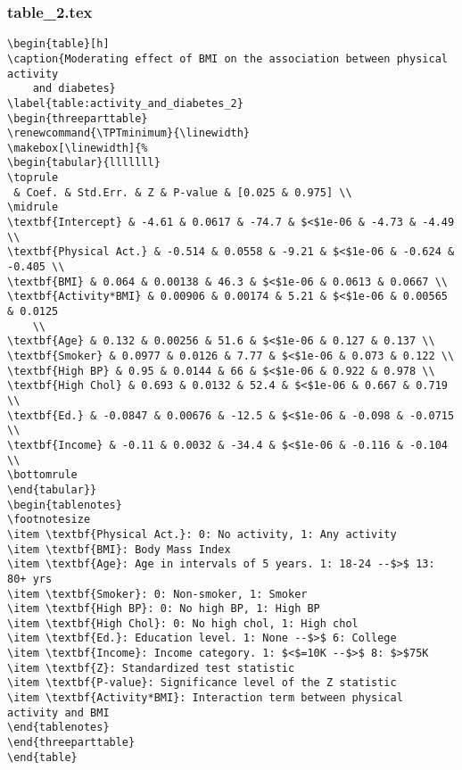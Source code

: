 \documentclass[11pt]{article}
\begin{document}
\subsubsection*{table\_2.tex}

\begin{Verbatim}[tabsize=4]
\begin{table}[h]
\caption{Moderating effect of BMI on the association between physical activity
	and diabetes}
\label{table:activity_and_diabetes_2}
\begin{threeparttable}
\renewcommand{\TPTminimum}{\linewidth}
\makebox[\linewidth]{%
\begin{tabular}{lllllll}
\toprule
 & Coef. & Std.Err. & Z & P-value & [0.025 & 0.975] \\
\midrule
\textbf{Intercept} & -4.61 & 0.0617 & -74.7 & $<$1e-06 & -4.73 & -4.49 \\
\textbf{Physical Act.} & -0.514 & 0.0558 & -9.21 & $<$1e-06 & -0.624 & -0.405 \\
\textbf{BMI} & 0.064 & 0.00138 & 46.3 & $<$1e-06 & 0.0613 & 0.0667 \\
\textbf{Activity*BMI} & 0.00906 & 0.00174 & 5.21 & $<$1e-06 & 0.00565 & 0.0125
	\\
\textbf{Age} & 0.132 & 0.00256 & 51.6 & $<$1e-06 & 0.127 & 0.137 \\
\textbf{Smoker} & 0.0977 & 0.0126 & 7.77 & $<$1e-06 & 0.073 & 0.122 \\
\textbf{High BP} & 0.95 & 0.0144 & 66 & $<$1e-06 & 0.922 & 0.978 \\
\textbf{High Chol} & 0.693 & 0.0132 & 52.4 & $<$1e-06 & 0.667 & 0.719 \\
\textbf{Ed.} & -0.0847 & 0.00676 & -12.5 & $<$1e-06 & -0.098 & -0.0715 \\
\textbf{Income} & -0.11 & 0.0032 & -34.4 & $<$1e-06 & -0.116 & -0.104 \\
\bottomrule
\end{tabular}}
\begin{tablenotes}
\footnotesize
\item \textbf{Physical Act.}: 0: No activity, 1: Any activity
\item \textbf{BMI}: Body Mass Index
\item \textbf{Age}: Age in intervals of 5 years. 1: 18-24 --$>$ 13: 80+ yrs
\item \textbf{Smoker}: 0: Non-smoker, 1: Smoker
\item \textbf{High BP}: 0: No high BP, 1: High BP
\item \textbf{High Chol}: 0: No high chol, 1: High chol
\item \textbf{Ed.}: Education level. 1: None --$>$ 6: College
\item \textbf{Income}: Income category. 1: $<$=10K --$>$ 8: $>$75K
\item \textbf{Z}: Standardized test statistic
\item \textbf{P-value}: Significance level of the Z statistic
\item \textbf{Activity*BMI}: Interaction term between physical activity and BMI
\end{tablenotes}
\end{threeparttable}
\end{table}

\end{Verbatim}




\end{document}
